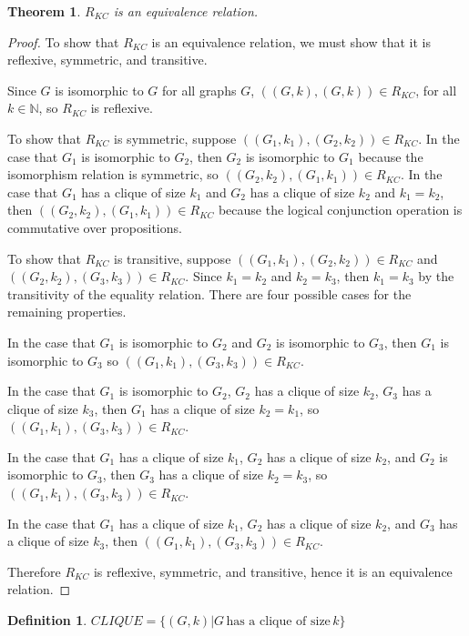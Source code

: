 \documentclass{article}
\newtheorem{theorem}{Theorem}%
\theoremstyle{definition}
\newtheorem{definition}{Definition}%
\newcommand{\plain}[1]{\,\text{#1}\,} %
\begin{document}
\begin{theorem}$R_{KC}$ is an equivalence relation.\end{theorem}
\begin{proof}To show that $R_{KC}$ is an equivalence relation, we must show
  that it is reflexive, symmetric, and transitive.

  Since $G$ is isomorphic to $G$ for all graphs $G$, $((G,k),(G,k))\in R_{KC}$,
  for all $k\in\mathbb{N}$, so $R_{KC}$ is reflexive.

  To show that $R_{KC}$ is symmetric, suppose $((G_1, k_1), (G_2, k_2))\in
  R_{KC}$. In the case that $G_1$ is isomorphic to $G_2$, then $G_2$ is
  isomorphic to $G_1$ because the isomorphism relation is symmetric, so
  $((G_2,k_2),(G_1,k_1))\in R_{KC}$. In the case that $G_1$ has a clique of
  size $k_1$ and $G_2$ has a clique of size $k_2$ and $k_1=k_2$, then
  $((G_2,k_2),(G_1,k_1))\in R_{KC}$ because the logical conjunction operation
  is commutative over propositions.

  To show that $R_{KC}$ is transitive, suppose $((G_1, k_1), (G_2, k_2))\in
  R_{KC}$ and $((G_2, k_2), (G_3, k_3))\in R_{KC}$. Since $k_1=k_2$ and
  $k_2=k_3$, then $k_1=k_3$ by the transitivity of the equality relation. There
  are four possible cases for the remaining properties.

  In the case that $G_1$ is isomorphic to $G_2$ and $G_2$ is isomorphic to
  $G_3$, then $G_1$ is isomorphic to $G_3$ so $((G_1, k_1), (G_3, k_3))\in
  R_{KC}$.

  In the case that $G_1$ is isomorphic to $G_2$, $G_2$ has a clique of size
  $k_2$, $G_3$ has a clique of size $k_3$, then $G_1$ has a clique of size
  $k_2=k_1$, so $((G_1, k_1), (G_3, k_3))\in R_{KC}$.

  In the case that $G_1$ has a clique of size $k_1$, $G_2$ has a clique of size
  $k_2$, and $G_2$ is isomorphic to $G_3$, then $G_3$ has a clique
  of size $k_2=k_3$, so $((G_1, k_1), (G_3, k_3))\in R_{KC}$.

  In the case that $G_1$ has a clique of size $k_1$, $G_2$ has a clique of size
  $k_2$, and $G_3$ has a clique of size $k_3$, then $((G_1, k_1), (G_3,
  k_3))\in R_{KC}$.

  Therefore $R_{KC}$ is reflexive, symmetric, and transitive, hence it is an
  equivalence relation.
\end{proof}

\begin{definition}
  $CLIQUE=\{(G,k)|G \plain{has a clique of size} k\}$
\end{definition}
\end{document}
